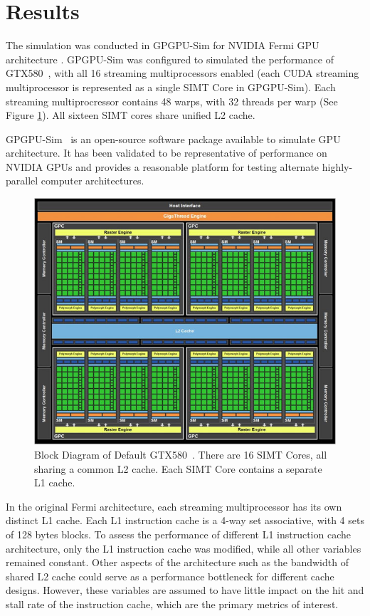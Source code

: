 \section{Results}

The simulation was conducted in GPGPU-Sim for NVIDIA Fermi GPU
architecture \cite{bakhodayuan09}. 
GPGPU-Sim was configured to simulated the performance of
GTX580~\cite{gf100}, with all 16 streaming multiprocessors enabled
(each CUDA streaming multiprocessor is represented as a single SIMT
Core in GPGPU-Sim). 
Each streaming multiprocressor contains 48 warps, with 32 threads per
warp (See Figure \ref{GTX580}). 
All sixteen SIMT cores share unified L2 cache.

GPGPU-Sim~\cite{bakhodayuan09} is an open-source software package
available to simulate GPU architecture. 
It has been validated to be representative of performance on NVIDIA
GPUs and provides a reasonable platform for testing alternate
highly-parallel computer architectures.

\begin{figure}[ht!]
\centering
\includegraphics[width=\columnwidth]{graphics/GTX580.jpg}
\caption{Block Diagram of Default GTX580~\cite{gf100}. There are 16 SIMT Cores, all sharing a common L2 cache. Each SIMT Core contains a separate L1 cache.}
\label{GTX580}
\end{figure}

In the original Fermi architecture, each streaming multiprocessor has
its own distinct L1 cache. 
Each L1 instruction cache is a 4-way set associative, with 4 sets of
128 bytes blocks. 
To assess the  performance of different L1 instruction cache
architecture, only the L1 instruction cache was modified, while all
other variables remained constant. 
Other aspects of the architecture such as the bandwidth of shared L2
cache could serve as a performance bottleneck for different cache
designs. 
However, these variables are assumed to have little impact on the hit
and stall rate of the instruction cache, which are the primary metrics
of interest.

